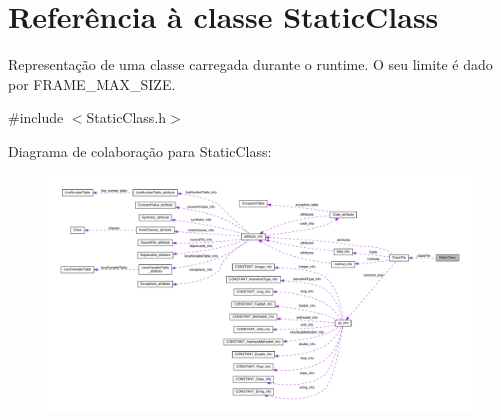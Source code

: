 \hypertarget{classStaticClass}{}\section{Referência à classe Static\+Class}
\label{classStaticClass}


Representação de uma classe carregada durante o runtime. O seu limite é dado por {\ttfamily F\+R\+A\+M\+E\+\_\+\+M\+A\+X\+\_\+\+S\+I\+ZE}.  




{\ttfamily \#include $<$Static\+Class.\+h$>$}



Diagrama de colaboração para Static\+Class\+:
\nopagebreak
\begin{figure}[H]
\begin{center}
\leavevmode
\includegraphics[width=350pt]{classStaticClass__coll__graph}
\end{center}
\end{figure}
